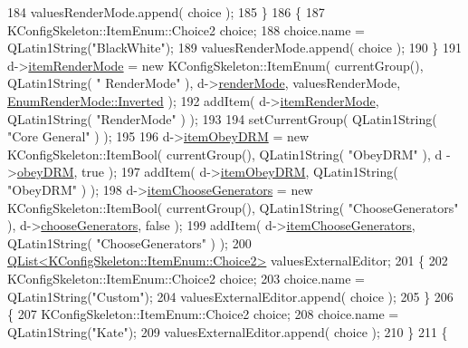 \begin{DoxyCode}
184     valuesRenderMode.append( choice );
185   \}
186   \{
187     KConfigSkeleton::ItemEnum::Choice2 choice;
188     choice.name = QLatin1String(\textcolor{stringliteral}{"BlackWhite"});
189     valuesRenderMode.append( choice );
190   \}
191   d->\hyperlink{classOkular_1_1SettingsCorePrivate_a71e8dac91dc9da059a8a263611d5326b}{itemRenderMode} = \textcolor{keyword}{new} KConfigSkeleton::ItemEnum( currentGroup(), QLatin1String( \textcolor{stringliteral}{"
      RenderMode"} ), d->\hyperlink{classOkular_1_1SettingsCorePrivate_adee868b29bdba3ccd3c199b2ad05a0f9}{renderMode}, valuesRenderMode, \hyperlink{classOkular_1_1SettingsCore_1_1EnumRenderMode_aae172bdb345dda4d639e763709ea357aae3a52d8c06b668f28a3f3d646c49d3b0}{EnumRenderMode::Inverted} );
192   addItem( d->\hyperlink{classOkular_1_1SettingsCorePrivate_a71e8dac91dc9da059a8a263611d5326b}{itemRenderMode}, QLatin1String( \textcolor{stringliteral}{"RenderMode"} ) );
193 
194   setCurrentGroup( QLatin1String( \textcolor{stringliteral}{"Core General"} ) );
195 
196   d->\hyperlink{classOkular_1_1SettingsCorePrivate_a9c750a7d32e4513c0b42b8e2d567fd67}{itemObeyDRM} = \textcolor{keyword}{new} KConfigSkeleton::ItemBool( currentGroup(), QLatin1String( \textcolor{stringliteral}{"ObeyDRM"} ), d
      ->\hyperlink{classOkular_1_1SettingsCorePrivate_a7c937970be4909da5e6c87b808508ff7}{obeyDRM}, \textcolor{keyword}{true} );
197   addItem( d->\hyperlink{classOkular_1_1SettingsCorePrivate_a9c750a7d32e4513c0b42b8e2d567fd67}{itemObeyDRM}, QLatin1String( \textcolor{stringliteral}{"ObeyDRM"} ) );
198   d->\hyperlink{classOkular_1_1SettingsCorePrivate_a92c13edf8b753540c0935dbd3d713444}{itemChooseGenerators} = \textcolor{keyword}{new} KConfigSkeleton::ItemBool( currentGroup(), 
      QLatin1String( \textcolor{stringliteral}{"ChooseGenerators"} ), d->\hyperlink{classOkular_1_1SettingsCorePrivate_af564ef01d5e733d826c719a8694e2031}{chooseGenerators}, \textcolor{keyword}{false} );
199   addItem( d->\hyperlink{classOkular_1_1SettingsCorePrivate_a92c13edf8b753540c0935dbd3d713444}{itemChooseGenerators}, QLatin1String( \textcolor{stringliteral}{"ChooseGenerators"} ) );
200   \hyperlink{classQList}{QList<KConfigSkeleton::ItemEnum::Choice2>} valuesExternalEditor;
201   \{
202     KConfigSkeleton::ItemEnum::Choice2 choice;
203     choice.name = QLatin1String(\textcolor{stringliteral}{"Custom"});
204     valuesExternalEditor.append( choice );
205   \}
206   \{
207     KConfigSkeleton::ItemEnum::Choice2 choice;
208     choice.name = QLatin1String(\textcolor{stringliteral}{"Kate"});
209     valuesExternalEditor.append( choice );
210   \}
211   \{

\end{DoxyCode}
